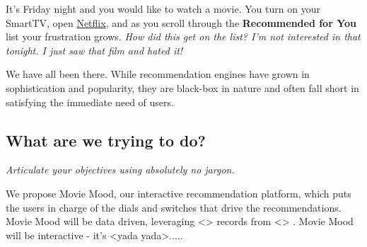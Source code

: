 It's Friday night and you would like to watch a movie.  You turn on your SmartTV, open \href{http://www.netflix.com}{Netflix}, and as you scroll through the \textbf{Recommended for You} list your frustration grows.   \textit{How did this get on the list?  I'm not interested in that tonight.  I just saw that film and hated it!}  

We have all been there.   While recommendation engines have grown in sophistication and popularity, they are black-box in nature and often fall short in satisfying the immediate need of users.   

\subsection{What are we trying to do?}
\textit{Articulate your objectives using absolutely no jargon.}

We propose Movie Mood, our interactive recommendation platform, which puts the users in charge of the dials and switches that drive the recommendations.   Movie Mood will be data driven, leveraging <> records from <> .   Movie Mood will be interactive - it's <yada yada>.....


